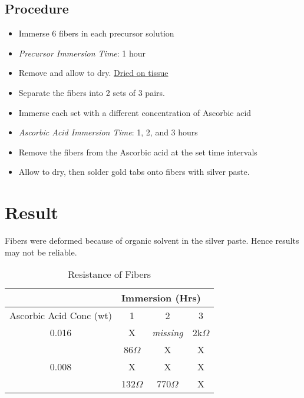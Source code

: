 \documentclass{article}
\begin{document}
\subsection{Procedure}
\begin{itemize}
    \item Immerse 6 fibers in each precursor solution
    \item \textit{Precursor Immersion Time}: 1 hour
    \item Remove and allow to dry. \underline{Dried on tissue}
    \item Separate the fibers into 2 sets of 3 pairs.
    \item Immerse each set with a different concentration of Ascorbic acid
    \item \textit{Ascorbic Acid Immersion Time}: 1, 2, and 3 hours
    \item Remove the fibers from the Ascorbic acid at the set time intervals 
    \item Allow to dry, then solder gold tabs onto fibers with silver paste.
\end{itemize}

\pagebreak
\section{Result}
Fibers were deformed because of organic solvent in the silver paste. Hence results may not be reliable.
\begin{table}[h!]
\centering
\begin{tabular}{ |c|c|c|c| } 
 \hline
& \multicolumn{3}{l|}{Immersion (Hrs)} \\ \hline
Ascorbic Acid Conc (wt) & 1 & 2 & 3  \\ 
 \hline
 0.016  & X & \textit{missing} & 2k$\Omega$ \\ 
 & 86$\Omega$ & X  & X \\ 
 \hline
 0.008 & X & X & X \\ 
& 132$\Omega$ & 770$\Omega$ & X  \\ 
 \hline
\end{tabular}
 \caption{Resistance of Fibers}
\label{table:1}
\end{table}
\end{document}
